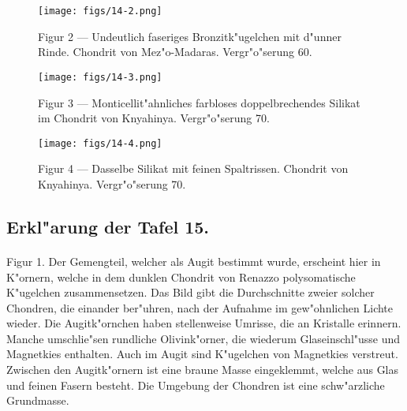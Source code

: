 \documentclass[a4paper, 11pt, oneside, polutonikogreek, german]{article}
\begin{document}
\vspace*{\fill}
\begin{figure}[H]
\centering
\texttt{[image: figs/14-2.png]}
\caption{\small Figur 2 --- Undeutlich faseriges Bronzitk"ugelchen mit d"unner Rinde. Chondrit von Mez"o-Madaras. Vergr"o"serung 60.}
\end{figure}
\vspace*{\fill}
\clearpage

\vspace*{\fill}
\begin{figure}[H]
\centering
\texttt{[image: figs/14-3.png]}
\caption{\small Figur 3 --- Monticellit"ahnliches farbloses doppelbrechendes Silikat im Chondrit von Knyahinya. Vergr"o"serung 70.}
\end{figure}
\vspace*{\fill}
\clearpage

\vspace*{\fill}
\begin{figure}[H]
\centering
\texttt{[image: figs/14-4.png]}
\caption{\small Figur 4 --- Dasselbe Silikat mit feinen Spaltrissen. Chondrit von Knyahinya. Vergr"o"serung 70.}
\end{figure}
\vspace*{\fill}
\clearpage

\subsection{Erkl"arung der Tafel 15.}
\paragraph{}
Figur 1. Der Gemengteil, welcher als Augit bestimmt wurde, erscheint hier in K"ornern, welche in dem dunklen Chondrit von Renazzo polysomatische K"ugelchen zusammensetzen. Das Bild gibt die Durchschnitte zweier solcher Chondren, die einander ber"uhren, nach der Aufnahme im gew"ohnlichen Lichte wieder. Die Augitk"ornchen haben stellenweise Umrisse, die an Kristalle erinnern. Manche umschlie"sen rundliche Olivink"orner, die wiederum Glaseinschl"usse und Magnetkies enthalten. Auch im Augit sind K"ugelchen von Magnetkies verstreut. Zwischen den Augitk"ornern ist eine braune Masse eingeklemmt, welche aus Glas und feinen Fasern besteht. Die Umgebung der Chondren ist eine schw"arzliche Grundmasse.
\end{document}

